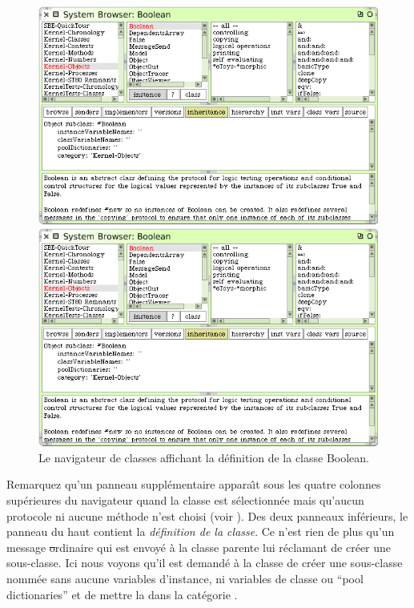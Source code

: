 \documentclass[a4paper,10pt,twoside]{book}
\begin{document}

\begin{figure}[hbt]
\ifluluelse
	{\centerline {\includegraphics[width=\textwidth]{Kernel-objects-boolean}}}
	{\centerline {\includegraphics[scale=0.7]{Kernel-objects-boolean}}}
\caption{Le navigateur de classes affichant la d\'efinition de la
  classe Boolean.\label{fig:browseBoolean}}
\end{figure}

Remarquez qu'un panneau suppl\'ementaire appara\^{\i}t sous les quatre
colonnes sup\'erieures du navigateur quand la classe  est
s\'electionn\'ee mais qu'aucun protocole ni aucune m\'ethode n'est choisi
(voir ).
Des deux panneaux inf\'erieurs, le panneau du haut contient la 
\emph{d\'efinition de la classe}.
Ce n'est rien de plus qu'un message \st ordinaire qui est envoy\'e \`a
la classe parente lui r\'eclamant de cr\'eer une sous-classe.
Ici nous voyons qu'il est demand\'e \`a la classe  de
cr\'eer une sous-classe nomm\'ee  sans aucune variables
d'instance, ni variables de classe ou ``pool dictionaries'' et de 
mettre la  dans la cat\'egorie .
\end{document}
